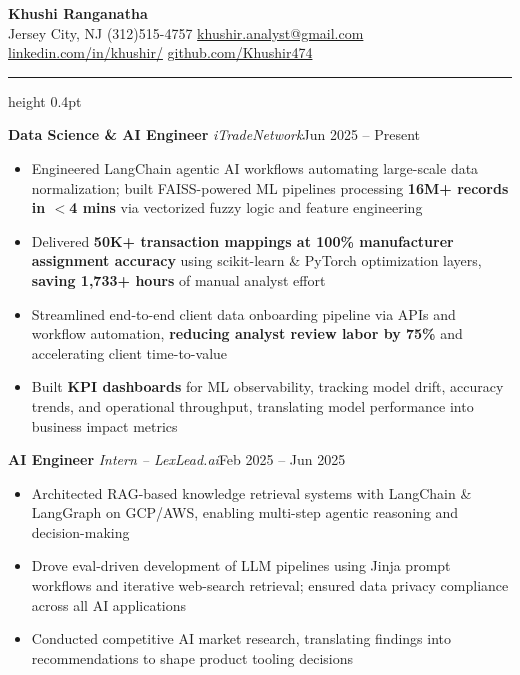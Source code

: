 \documentclass[10pt, letterpaper]{article}
\newcommand{\ressection}[1]{%
  \noindent{\large\bfseries\scshape #1}\par%
  \vspace{1pt}%
  \hrule height 0.4pt%
  \vspace{3pt}%
}
\newcommand{\jobentry}[3]{%
  \noindent\textbf{#1} \textbar{} \textit{#2}\hfill #3\par\vspace{-2pt}%
}
\newenvironment{bullets}{%
  \begin{itemize}[
    leftmargin=0.125in,
    itemsep=0pt,
    parsep=0pt,
    topsep=0pt,
    partopsep=0pt,
    label=\textbullet
  ]
}{%
  \end{itemize}
}
\begin{document}
\begin{center}
  {\fontsize{15}{18}\selectfont\bfseries{}\selectfont Khushi Ranganatha}\\[3pt]
  Jersey City, NJ \textperiodcentered{}
  (312)515-4757 \textperiodcentered{}
  \href{mailto:khushir.analyst@gmail.com}{khushir.analyst@gmail.com} \textperiodcentered{}
  \href{https://www.linkedin.com/in/khushir/}{linkedin.com/in/khushir/} \textperiodcentered{}
  \href{https://github.com/Khushir474}{github.com/Khushir474}
\end{center}

\ressection{Work Experience}

\jobentry{Data Science \& AI Engineer}{\selectfont iTradeNetwork}{Jun 2025 -- Present}
\begin{bullets}
  \item Engineered LangChain agentic AI workflows automating large-scale data normalization; built FAISS-powered ML pipelines processing \textbf{16M+ records in $<$4 mins} via vectorized fuzzy logic and feature engineering
  \item Delivered \textbf{50K+ transaction mappings at 100\% manufacturer assignment accuracy} using scikit-learn \& PyTorch optimization layers, \textbf{saving 1,733+ hours} of manual analyst effort
  \item Streamlined end-to-end client data onboarding pipeline via APIs and workflow automation, \textbf{reducing analyst review labor by 75\%} and accelerating client time-to-value
  \item Built \textbf{KPI dashboards} for ML observability, tracking model drift, accuracy trends, and operational throughput, translating model performance into business impact metrics
\end{bullets}

\vspace{3pt}
\jobentry{AI Engineer}{\selectfont Intern -- LexLead.ai}{Feb 2025 -- Jun 2025}
\begin{bullets}
  \item Architected RAG-based knowledge retrieval systems with LangChain \& LangGraph on GCP/AWS, enabling multi-step agentic reasoning and decision-making
  \item Drove eval-driven development of LLM pipelines using Jinja prompt workflows and iterative web-search retrieval; ensured data privacy compliance across all AI applications
  \item Conducted competitive AI market research, translating findings into recommendations to shape product tooling decisions
\end{bullets}
\end{document}
